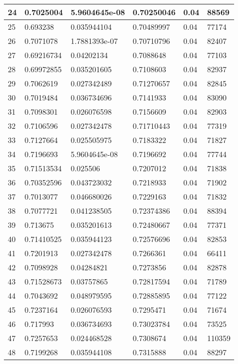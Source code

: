 \begin{longtable}{|l|l|l|l|l|l|}
24 & 0.7025004 & 5.9604645e-08 & 0.70250046 & 0.04 & 88569 \\ \hline 
25 & 0.693238 & 0.035944104 & 0.70489997 & 0.04 & 77174 \\ \hline 
26 & 0.7071078 & 1.7881393e-07 & 0.70710796 & 0.04 & 82407 \\ \hline 
27 & 0.69216734 & 0.04202134 & 0.7088648 & 0.04 & 77103 \\ \hline 
28 & 0.69972855 & 0.035201605 & 0.7108603 & 0.04 & 82937 \\ \hline 
29 & 0.7062619 & 0.027342489 & 0.71270657 & 0.04 & 82845 \\ \hline 
30 & 0.7019484 & 0.036734696 & 0.7141933 & 0.04 & 83090 \\ \hline 
31 & 0.7098301 & 0.026076598 & 0.7156609 & 0.04 & 82903 \\ \hline 
32 & 0.7106596 & 0.027342478 & 0.71710443 & 0.04 & 77319 \\ \hline 
33 & 0.7127664 & 0.025505975 & 0.7183322 & 0.04 & 71827 \\ \hline 
34 & 0.7196693 & 5.9604645e-08 & 0.7196692 & 0.04 & 77744 \\ \hline 
35 & 0.71513534 & 0.025506 & 0.7207012 & 0.04 & 71838 \\ \hline 
36 & 0.70352596 & 0.043723032 & 0.7218933 & 0.04 & 71902 \\ \hline 
37 & 0.7013077 & 0.046680026 & 0.7229163 & 0.04 & 71832 \\ \hline 
38 & 0.7077721 & 0.041238505 & 0.72374386 & 0.04 & 88394 \\ \hline 
39 & 0.713675 & 0.035201613 & 0.72480667 & 0.04 & 77371 \\ \hline 
40 & 0.71410525 & 0.035944123 & 0.72576696 & 0.04 & 82853 \\ \hline 
41 & 0.7201913 & 0.027342478 & 0.7266361 & 0.04 & 66411 \\ \hline 
42 & 0.7098928 & 0.04284821 & 0.7273856 & 0.04 & 82878 \\ \hline 
43 & 0.71528673 & 0.03757865 & 0.72817594 & 0.04 & 71789 \\ \hline 
44 & 0.7043692 & 0.048979595 & 0.72885895 & 0.04 & 77122 \\ \hline 
45 & 0.7237164 & 0.026076593 & 0.7295471 & 0.04 & 71674 \\ \hline 
46 & 0.717993 & 0.036734693 & 0.73023784 & 0.04 & 73525 \\ \hline 
47 & 0.7257653 & 0.024468528 & 0.7308674 & 0.04 & 110359 \\ \hline 
48 & 0.7199268 & 0.035944108 & 0.7315888 & 0.04 & 88297 \\ \hline 

\end{longtable}
